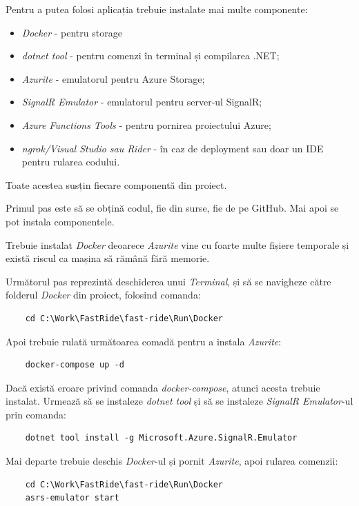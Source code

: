 Pentru a putea folosi aplicația trebuie instalate mai multe componente:
\begin{itemize}
    \item \textit{Docker} - pentru storage
    \item \textit{dotnet tool} - pentru comenzi în terminal și compilarea .NET;
    \item \textit{Azurite} - emulatorul pentru Azure Storage;
    \item \textit{SignalR Emulator} - emulatorul pentru server-ul SignalR;
    \item \textit{Azure Functions Tools} - pentru pornirea proiectului Azure;
    \item \textit{ngrok/Visual Studio sau Rider} - în caz de deployment sau doar un IDE pentru rularea codului.
\end{itemize}

Toate acestea susțin fiecare componentă din proiect.

Primul pas este să se obțină codul, fie din surse, fie de pe GitHub.
Mai apoi se pot instala componentele.

Trebuie instalat \textit{Docker} deoarece \textit{Azurite} vine cu foarte multe fișiere temporale și
există riscul ca mașina să rămână fără memorie.

Următorul pas reprezintă deschiderea unui \textit{Terminal}, și să se navigheze către folderul \textit{Docker} din proiect, folosind
comanda:
\begin{verbatim}
    cd C:\Work\FastRide\fast-ride\Run\Docker
\end{verbatim}
Apoi trebuie rulată următoarea comadă pentru a instala \textit{Azurite}:
\begin{verbatim}
    docker-compose up -d
\end{verbatim}
Dacă există eroare privind comanda \textit{docker-compose}, atunci acesta trebuie instalat.
Urmează să se instaleze \textit{dotnet tool} și să se instaleze \textit{SignalR Emulator}-ul prin comanda:
\begin{verbatim}
    dotnet tool install -g Microsoft.Azure.SignalR.Emulator
\end{verbatim}

Mai departe trebuie deschis \textit{Docker}-ul și pornit \textit{Azurite}, apoi rularea comenzii:

\begin{verbatim}
    cd C:\Work\FastRide\fast-ride\Run\Docker
    asrs-emulator start
\end{verbatim}

